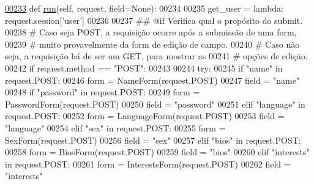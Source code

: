 \begin{DoxyCode}
\hypertarget{classProfile_1_1ProfileUnit_1_1UiFullProfile_l00233}{}\hyperlink{classProfile_1_1ProfileUnit_1_1UiFullProfile_a7a7747246b627020a345f7a3eac27778}{00233}     \textcolor{keyword}{def }\hyperlink{classProfile_1_1ProfileUnit_1_1UiFullProfile_a7a7747246b627020a345f7a3eac27778}{run}(self, request, field=None):
00234 
00235         get\_user = \textcolor{keyword}{lambda}: request.session[\textcolor{stringliteral}{'user'}]
00236 
00237         \textcolor{comment}{## @if Verifica qual o propósito do submit.}
00238         \textcolor{comment}{#   Caso seja POST, a requisição ocorre após a submissão de uma form,}
00239         \textcolor{comment}{#       muito provavelmente da form de edição de campo.}
00240         \textcolor{comment}{#   Caso não seja, a requisição há de ser um GET, para mostrar as}
00241         \textcolor{comment}{#       opções de edição.}
00242         \textcolor{keywordflow}{if} request.method == \textcolor{stringliteral}{"POST"}:
00243 
00244             \textcolor{keywordflow}{try}:
00245                 \textcolor{keywordflow}{if}   \textcolor{stringliteral}{"name"} \textcolor{keywordflow}{in} request.POST:
00246                     form = NameForm(request.POST)
00247                     field = \textcolor{stringliteral}{"name"}
00248                 \textcolor{keywordflow}{if}  \textcolor{stringliteral}{"password"} \textcolor{keywordflow}{in} request.POST:
00249                     form = PasswordForm(request.POST)
00250                     field = \textcolor{stringliteral}{"password"}
00251                 \textcolor{keywordflow}{elif} \textcolor{stringliteral}{"language"} \textcolor{keywordflow}{in} request.POST:
00252                     form = LanguageForm(request.POST)
00253                     field = \textcolor{stringliteral}{"language"}
00254                 \textcolor{keywordflow}{elif} \textcolor{stringliteral}{"sex"} \textcolor{keywordflow}{in} request.POST:
00255                     form = SexForm(request.POST)
00256                     field = \textcolor{stringliteral}{"sex"}
00257                 \textcolor{keywordflow}{elif} \textcolor{stringliteral}{"bios"} \textcolor{keywordflow}{in} request.POST:
00258                     form = BiosForm(request.POST)
00259                     field = \textcolor{stringliteral}{"bios"}
00260                 \textcolor{keywordflow}{elif} \textcolor{stringliteral}{"interests"} \textcolor{keywordflow}{in} request.POST:
00261                     form = InterestsForm(request.POST)
00262                     field = \textcolor{stringliteral}{"interests"}

\end{DoxyCode}

